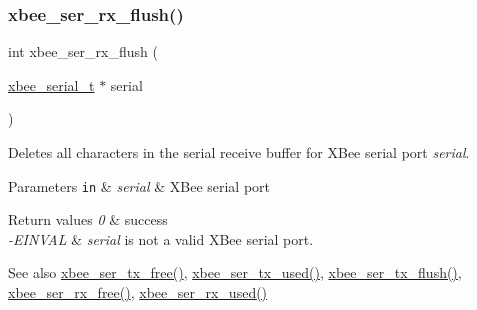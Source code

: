 \mbox{\label{group__xbee__serial_ga98a6d5ceb5e1445e8ef82ccaa65a8c15}} 
\subsubsection{\texorpdfstring{xbee\+\_\+ser\+\_\+rx\+\_\+flush()}{xbee\_ser\_rx\_flush()}}
{\footnotesize\ttfamily int xbee\+\_\+ser\+\_\+rx\+\_\+flush (\begin{DoxyParamCaption}\item[{\hyperlink{structxbee__serial__t}{xbee\+\_\+serial\+\_\+t} $\ast$}]{serial }\end{DoxyParamCaption})}



Deletes all characters in the serial receive buffer for X\+Bee serial port {\itshape serial}. 


\begin{DoxyParams}[1]{Parameters}
\mbox{\tt in}  & {\em serial} & X\+Bee serial port\\
\hline
\end{DoxyParams}

\begin{DoxyRetVals}{Return values}
{\em 0} & success \\
\hline
{\em -\/\+E\+I\+N\+V\+AL} & {\itshape serial} is not a valid X\+Bee serial port.\\
\hline
\end{DoxyRetVals}
\begin{DoxySeeAlso}{See also}
\hyperlink{group__xbee__serial_ga3ad8f378b572d6fec982f1086bd3b94f}{xbee\+\_\+ser\+\_\+tx\+\_\+free()}, \hyperlink{group__xbee__serial_gaabf70934d186354cde4ac14ed27d1bd2}{xbee\+\_\+ser\+\_\+tx\+\_\+used()}, \hyperlink{group__xbee__serial_ga05308d37301d27715f1e1308b7189220}{xbee\+\_\+ser\+\_\+tx\+\_\+flush()}, \hyperlink{group__xbee__serial_ga16fb431a1e66861439518e562431821f}{xbee\+\_\+ser\+\_\+rx\+\_\+free()}, \hyperlink{group__xbee__serial_ga43b8322771cc16b4130fa5330ad2242b}{xbee\+\_\+ser\+\_\+rx\+\_\+used()} 
\end{DoxySeeAlso}
\mbox{\label{group__xbee__serial_ga16fb431a1e66861439518e562431821f}} 
